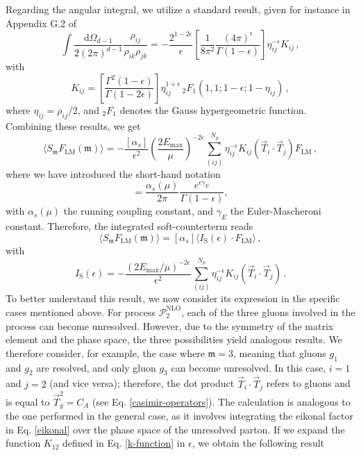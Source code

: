 \documentclass[a4paper, 12pt]{book}
\newcommand{\um}{\mathfrak{m}}
\begin{document}
Regarding the angular integral, we utilize a standard result, given for instance in Appendix G.2 of \cite{Asteriadis:1910}
\begin{equation}
  \int \frac{\mathrm{d}\Omega_{d-1}}{2 (2 \pi)^{d-1}} \frac{\rho_{ij}}{\rho_{ik}\rho_{jk} } = - \frac{2^{1-2\epsilon}}{\epsilon} \left[\frac{1}{8 \pi^2} \frac{(4\pi)^{\epsilon}}{\Gamma(1-\epsilon)}  \right]\eta_{ij}^{-\epsilon} K_{ij} \, ,
\end{equation}
with
\begin{equation}
  K_{ij} = \left[ \frac{\Gamma^2(1-\epsilon)}{\Gamma(1-2\epsilon)}\right] \eta_{ij}^{1+\epsilon} \, {}_2F_1(1,1;1-\epsilon; 1-\eta_{ij}) \, ,
  \label{k-function}
\end{equation}
where $\eta_{ij}=\rho_{ij}/2$, and ${}_2F_1$ denotes the Gauss hypergeometric function. Combining these results, we get 
\begin{equation}
   \langle S_\um F_{\mathrm{LM}} (\um) \rangle = - \frac{[\alpha_s]}{\epsilon^2} \left(\frac{2 E_{\mathrm{max}}}{\mu}\right)^{-2\epsilon} \sum_{(ij)}^{N_p} \eta_{ij}^{-\epsilon}  K_{ij} (\vec{T}_i \cdot \vec{T}_j) F_{\mathrm{LM}} \, ,
   \label{soft-limit}
\end{equation}
where we have introduced the short-hand notation
\begin{equation}
  [\alpha_s]= \frac{\alpha_s(\mu)}{2\pi} \frac{e^{\epsilon \gamma_E}}{\Gamma(1-\epsilon)}, 
\end{equation}
with $\alpha_s(\mu)$ the running coupling constant, and $\gamma_E$ the Euler-Mascheroni constant. Therefore, the integrated soft-counterterm reads
\begin{equation}
  \langle S_\um F_{\mathrm{LM}} (\um) \rangle = [\alpha_s] \langle I_{\mathrm{S}}(\epsilon) \cdot F_{\mathrm{LM}}\rangle \, , 
  \label{soft-regulated}
\end{equation}
with 
\begin{equation}
  I_\mathrm{S}(\epsilon)= - \frac{\left(2E_{\mathrm{max}}/\mu\right)^{-2\epsilon}}{\epsilon^2} \sum_{(ij)}^{N_p} \eta_{ij}^{-\epsilon} K_{ij} (\vec{T}_i \cdot \vec{T}_j) \, .
  \label{I-s-operator}
\end{equation}
To better understand this result, we now consider its expression in the specific cases mentioned above. For process $\mathcal{P}_{2}^{\mathrm{NLO}}$, each of the three gluons involved in the process can become unresolved. However, due to the symmetry of the matrix element and the phase space, the three possibilities yield analogous results. We therefore consider, for example, the case where $\um=3$, meaning that gluons $g_1$ and $g_2$ are resolved, and only gluon $g_3$ can become unresolved. In this case, $i=1$ and $j=2$ (and vice versa); therefore, the dot product $\vec{T}_i \cdot \vec{T}_j$ refers to gluons and is equal to $\vec{T}_g^2 = C_A$ (see Eq. \ref{casimir-operators}). The calculation is analogous to the one performed in the general case, as it involves integrating the eikonal factor in Eq. \ref{eikonal} over the phase space of the unresolved parton. If we expand the function $K_{12}$ defined in Eq. \ref{k-function} in $\epsilon$, we obtain the following result
\end{document}
